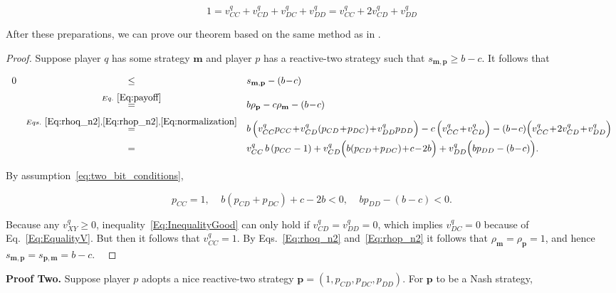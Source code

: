 \documentclass{article}
\theoremstyle{definition}
\begin{document}
\begin{equation} \label{Eq:normalization}
1 = v^q_{CC} +  v^q_{CD} + v^q_{DC} + v^q_{DD} = v^q_{CC} +  2v^q_{CD} + v^q_{DD}
\end{equation}

After these preparations, we can prove our theorem based on the same method as in \citet{akin:EGADS:2016}.
 
\begin{proof}
Suppose player $q$ has some strategy $\mathbf{m}$ and player $p$ has a reactive-two
strategy such that $s_{\mathbf{m}, \mathbf{p}} \ge b\!-\!c$. It follows that

\begin{equation} \label{Eq:InequalityGood}
\begin{array}{rcl}
0 	&\le	&s_{\mathbf{m}, \mathbf{p}}-(b\!-\!c)\\[0.2cm]
	&\stackrel{Eq.~\eqref{Eq:payoff}}{=}	&b\rho_\mathbf{p} - c\rho_\mathbf{m}-(b\!-\!c)\\[0.2cm]
	&\stackrel{Eqs.~\eqref{Eq:rhoq_n2}, \eqref{Eq:rhop_n2}, \eqref{Eq:normalization}}{=}	&b\,\Big( v^q_{CC} p_{CC} \!+\!  v^q_{CD}(p_{CD}\!+\!p_{DC}) \!+\! v^q_{DD} p_{DD}\Big) 
		- c\,\Big(v^q_{CC} \!+\! v^q_{CD}\Big) - (b\!-\!c)\Big(v^q_{CC} \!+\!  2v^q_{CD} \!+\! v^q_{DD}\Big)\\[0.2cm]
	&=	&v^q_{CC} \,b\,(p_{CC}-1) + v^q_{CD}\Big(b(p_{CD}\!+\!p_{DC})\!+\!c\!-\!2b\Big) + v^q_{DD}\Big(bp_{DD}-(b\!-\!c)\Big).
\end{array}
\end{equation}

By assumption~\eqref{eq:two_bit_conditions},

\begin{equation}
p_{CC}=1,~~~~~b(p_{CD}\!+\!p_{DC})\!+\!c\!-\!2b<0,~~~~~bp_{DD}-(b\!-\!c)<0.
\end{equation}

Because any $v^q_{XY}\!\ge\!0$, inequality~\eqref{Eq:InequalityGood} can only
hold if $v^q_{CD}\!=\!v^q_{DD}\!=\!0$, which implies $v^q_{DC}\!=\!0$ because of
Eq.~\eqref{Eq:EqualityV}. But then it follows that $v^q_{CC}\!=\!1$. By
Eqs.~\eqref{Eq:rhoq_n2} and~\eqref{Eq:rhop_n2} it follows that
$\rho_\mathbf{m}\!=\!\rho_\mathbf{p}\!=\!1$, and hence
$s_{\mathbf{m}, \mathbf{p}}\!=\!s_{\mathbf{p}, \mathbf{m}}\!=\!b\!-\!c$. 
\
\end{proof}

{\bf Proof Two.} Suppose player $p$ adopts a nice reactive-two strategy
$\mathbf{p}\!=\!(1, p_{CD}, p_{DC}, p_{DD})$. For $\mathbf{p}$ to be a Nash
strategy,
\end{document}
